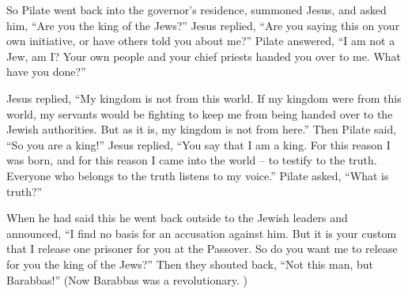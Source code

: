 {\par }{\PP {}So
Pilate
went
back
into
the governor’s residence,
summoned
Jesus,
and
asked
him,
“Are
you
the king
of the Jews?”
Jesus
replied, “Are
you
saying
this
on
your own initiative,
or
have
others
told
you
about
me?”
Pilate
answered,
“I
am
not
a Jew,
am I? Your own people
and
your
chief priests
handed
you
over
to me.
What
have you done?”
\par }{\PP {}Jesus
replied,
“My
kingdom
is
not
from
this
world.
If
my kingdom
were
from
this
world,
my
servants
would be fighting
to keep me
from being handed over
to the
Jewish
authorities. But
as it is, my
kingdom
is
not
from here.”
Then Pilate
said, “So
you
are
a king!” Jesus
replied,
“You
say
that
I
am
a king.
For
this
reason I was born,
and
for
this
reason I came
into
the world
– to testify
to the truth.
Everyone
who belongs
to
the
truth
listens
to
my
voice.”
Pilate
asked, “What
is
truth?”

\par }{\PP When
he had said
this
he went
back
outside
to
the Jewish leaders
and
announced, “I
find
no basis for an accusation against him.
But
it is
your
custom
that
I release
one
prisoner for you
at
the Passover.
So
do you want
me to release
for you
the king
of the Jews?”
Then
they shouted
back, “Not
this man,
but
Barabbas!” (Now
Barabbas
was
a revolutionary. )

}
